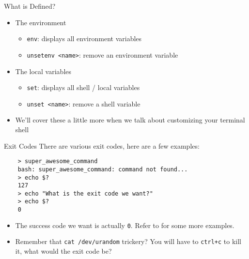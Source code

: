 \documentclass[11pt]{beamer}
\begin{document}
\begin{frame}[fragile]{What is Defined?}
  \begin{itemize}[<+- | alert@+>]
      \item The environment
      \begin{itemize}[<+- | alert@+>]
        \item \texttt{env}: displays all environment variables
        \item \texttt{unsetenv <name>}: remove an environment variable
      \end{itemize}
      \item The local variables
      \begin{itemize}[<+- | alert@+>]
        \item \texttt{set}: displays all shell / local variables
        \item \texttt{unset <name>}: remove a shell variable
      \end{itemize}
      \item We'll cover these a little more when we talk about customizing your terminal shell
  \end{itemize}
\end{frame}

\begin{frame}[fragile]{Exit Codes}
  There are various exit codes, here are a few examples:
  \begin{verbatim}
    > super_awesome_command
    bash: super_awesome_command: command not found...
    > echo $?
    127
    > echo "What is the exit code we want?"
    > echo $?
    0
  \end{verbatim}
  \begin{itemize}[<+- | alert@+>]
    \item The success code we want is actually \texttt{0}.  Refer to \cite{exit} for some more examples.
    \item Remember that \texttt{cat /dev/urandom} trickery?  You will have to \texttt{ctrl+c} to kill it, what
          would the exit code be?
  \end{itemize}
\end{frame}
\end{document}
